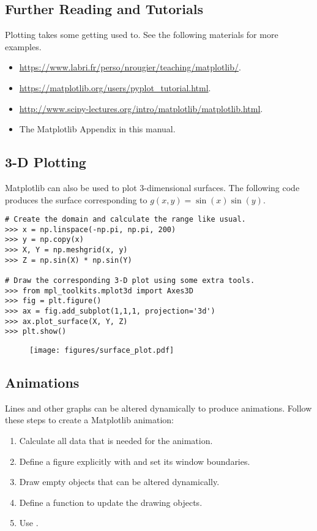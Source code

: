 \subsection*{Further Reading and Tutorials} %

Plotting takes some getting used to.
See the following materials for more examples.
\begin{itemize}
    \item \url{https://www.labri.fr/perso/nrougier/teaching/matplotlib/}.
    \item \url{https://matplotlib.org/users/pyplot_tutorial.html}.
    \item \url{http://www.scipy-lectures.org/intro/matplotlib/matplotlib.html}.
    \item The Matplotlib Appendix in this manual.
\end{itemize}

\subsection*{3-D Plotting} %

Matplotlib can also be used to plot 3-dimensional surfaces.
The following code produces the surface corresponding to $g(x,y) = \sin(x)\sin(y)$.

\begin{lstlisting}
# Create the domain and calculate the range like usual.
>>> x = np.linspace(-np.pi, np.pi, 200)
>>> y = np.copy(x)
>>> X, Y = np.meshgrid(x, y)
>>> Z = np.sin(X) * np.sin(Y)

# Draw the corresponding 3-D plot using some extra tools.
>>> from mpl_toolkits.mplot3d import Axes3D
>>> fig = plt.figure()
>>> ax = fig.add_subplot(1,1,1, projection='3d')
>>> ax.plot_surface(X, Y, Z)
>>> plt.show()
\end{lstlisting}

\begin{figure}[H]
    \texttt{[image: figures/surface\_plot.pdf]}
\end{figure}

\subsection*{Animations} %

Lines and other graphs can be altered dynamically to produce animations.
Follow these steps to create a Matplotlib animation:
%
\begin{enumerate}
    \item Calculate all data that is needed for the animation.
    \item Define a figure explicitly with  and set its window boundaries.
    \item Draw empty objects that can be altered dynamically.
    \item Define a function to update the drawing objects.
    \item Use .
\end{enumerate}

